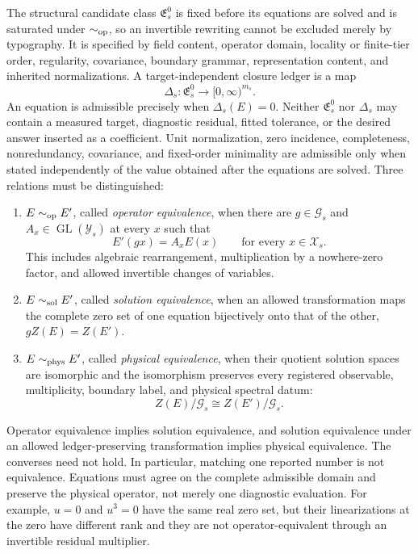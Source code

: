The structural candidate class $\mathfrak E_s^0$ is fixed before its equations
are solved and is saturated under $\sim_{\rm op}$, so an invertible rewriting
cannot be excluded merely by typography.  It is specified by field content, operator domain, locality or
finite-tier order, regularity, covariance, boundary grammar, representation
content, and inherited normalizations.  A target-independent closure ledger is
a map
\begin{equation}
 \Delta_s:\mathfrak E_s^0\longrightarrow[0,\infty)^{m_s}.
 \label{eq:pr35-closure-defect-map}
\end{equation}
An equation is admissible precisely when $\Delta_s(E)=0$.  Neither
$\mathfrak E_s^0$ nor $\Delta_s$ may contain a measured target, diagnostic
residual, fitted tolerance, or the desired answer inserted as a coefficient.
Unit normalization, zero incidence, completeness, nonredundancy, covariance,
and fixed-order minimality are admissible only when stated independently of the
value obtained after the equations are solved. Three relations must be distinguished:
\begin{enumerate}
 \item $E\sim_{\rm op}E'$, called \emph{operator equivalence}, when there are
 $g\in\mathcal G_s$ and $A_x\in\operatorname{GL}(\mathcal Y_s)$ at every $x$
 such
 that
 \begin{equation}
  E'(gx)=A_xE(x)
  \qquad\text{for every }x\in\mathcal X_s.
  \label{eq:pr35-operator-equivalence}
 \end{equation}
 This includes algebraic rearrangement, multiplication by a nowhere-zero
 factor, and allowed invertible changes of variables.
 \item $E\sim_{\rm sol}E'$, called \emph{solution equivalence}, when an allowed
 transformation maps the complete zero set of one equation bijectively onto
 that of the other, $gZ(E)=Z(E')$.
 \item $E\sim_{\rm phys}E'$, called \emph{physical equivalence}, when their
 quotient solution spaces are isomorphic and the isomorphism preserves every
 registered observable, multiplicity, boundary label, and physical spectral
 datum:
 \begin{equation}
  Z(E)/\mathcal G_s\cong Z(E')/\mathcal G_s.
  \label{eq:pr35-physical-equation-equivalence}
 \end{equation}
\end{enumerate}
Operator equivalence implies solution equivalence, and solution equivalence
under an allowed ledger-preserving transformation implies physical
equivalence.  The converses need not hold.  In particular, matching one
reported number is not equivalence.  Equations must agree on the complete
admissible domain and preserve the physical operator, not merely one
diagnostic evaluation.  For example, $u=0$ and $u^3=0$ have the same real zero
set, but their linearizations at the zero have different rank and they are not
operator-equivalent through an invertible residual multiplier.

